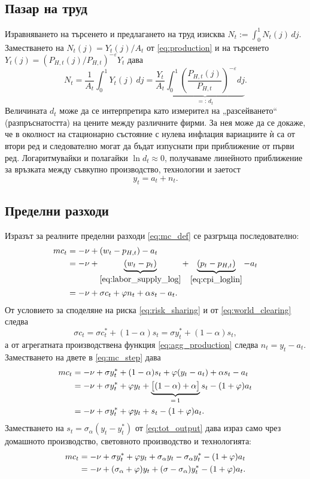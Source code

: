 \subsection{Пазар на труд}

Изравняването на търсенето и предлагането на труд изисква $N_t := \int_0^1 N_t(j)\, dj$. Заместването на $N_t(j) = Y_t(j)/A_t$ от \eqref{eq:production} и на търсенето $Y_t(j) = (P_{H,t}(j)/P_{H,t})^{-\varepsilon}Y_t$ дава
\[
N_t = \frac{1}{A_t}\int_0^1 Y_t(j)\, dj
= \frac{Y_t}{A_t} \underbrace{\int_0^1 \left( \frac{P_{H,t}(j)}{P_{H,t}} \right)^{-\varepsilon} dj}_{=: \, d_t}.
\]
Величината $d_t$ може да се интерпретира като измерител на „разсейването“ (разпръснатостта) на цените между различните фирми. За нея може да се докаже, че в околност на стационарно състояние с нулева инфлация вариациите ѝ са от втори ред и следователно могат да бъдат изпуснати при приближение от първи ред. Логаритмувайки и полагайки $\ln d_t \approx 0$, получаваме линейното приближение за връзката между съвкупно производство, технологии и заетост
\begin{equation}
y_t = a_t + n_t.
\label{eq:agg_production}
\end{equation}

\subsection{Пределни разходи}

Изразът за реалните пределни разходи \eqref{eq:mc_def} се разгръща последователно:
\begin{align}
mc_t &= -\nu + (w_t - p_{H,t}) - a_t \notag \\
&= -\nu + \underbrace{(w_t - p_t)}_{\eqref{eq:labor_supply_log}} + \underbrace{(p_t - p_{H,t})}_{\eqref{eq:cpi_loglin}} - a_t \notag \\
&= -\nu + \sigma c_t + \varphi n_t + \alpha s_t - a_t.
\label{eq:mc_step}
\end{align}
От условието за споделяне на риска \eqref{eq:risk_sharing} и от \eqref{eq:world_clearing} следва
\[
\sigma c_t = \sigma c^*_t + (1-\alpha)s_t = \sigma y^*_t + (1-\alpha)s_t,
\]
а от агрегатната производствена функция \eqref{eq:agg_production} следва $n_t = y_t - a_t$. Заместването на двете в \eqref{eq:mc_step} дава
\begin{align}
mc_t &= -\nu + \sigma y^*_t + (1-\alpha)s_t + \varphi(y_t - a_t) + \alpha s_t - a_t \notag \\
&= -\nu + \sigma y^*_t + \varphi y_t + \underbrace{\big[(1-\alpha) + \alpha\big]}_{= \, 1} s_t - (1+\varphi) a_t \notag \\
&= -\nu + \sigma y^*_t + \varphi y_t + s_t - (1+\varphi) a_t.
\label{eq:mc_tot}
\end{align}
Заместването на $s_t = \sigma_\alpha(y_t - y^*_t)$ от \eqref{eq:tot_output} дава израз само чрез домашното производство, световното производство и технологията:
\begin{align}
mc_t &= -\nu + \sigma y^*_t + \varphi y_t + \sigma_\alpha y_t - \sigma_\alpha y^*_t - (1+\varphi)a_t \notag \\
&= -\nu + (\sigma_\alpha + \varphi) y_t + (\sigma - \sigma_\alpha) y^*_t - (1+\varphi) a_t.
\label{eq:mc_final}
\end{align}

